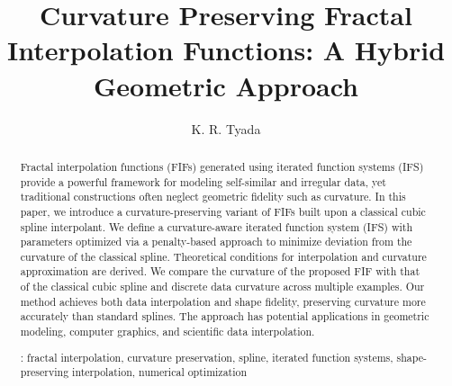 \documentclass[runningheads]{llncs}
\begin{document}
	\title{Curvature Preserving Fractal Interpolation Functions: A Hybrid Geometric Approach
	}
	\author{K. R. Tyada}
	\maketitle
	
	\begin{abstract}
		Fractal interpolation functions (FIFs) generated using iterated function systems (IFS) provide a powerful framework for modeling self-similar and irregular data, yet traditional constructions often neglect geometric fidelity such as curvature. In this paper, we introduce a curvature-preserving variant of FIFs built upon a classical cubic spline interpolant. We define a curvature-aware iterated function system (IFS) with parameters optimized via a penalty-based approach to minimize deviation from the curvature of the classical spline. Theoretical conditions for interpolation and curvature approximation are derived. We compare the curvature of the proposed FIF with that of the classical cubic spline and discrete data curvature across multiple examples. Our method achieves both data interpolation and shape fidelity, preserving curvature more accurately than standard splines. The approach has potential applications in geometric modeling, computer graphics, and scientific data interpolation.
		
		\vspace{0.5 cm}
		
		: fractal interpolation, curvature preservation, spline, iterated function systems, shape-preserving interpolation, numerical optimization
	\end{abstract}
	
\end{document}
